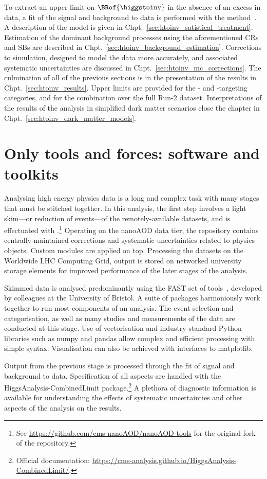 To extract an upper limit on $\BRof{\higgstoinv}$ in the absence of an excess in data, a fit of the signal and background to data is performed with the \CLs method~\cite{Read_2002}. A description of the model is given in Chpt.~\ref{sec:htoinv_satistical_treatment}. Estimation of the dominant background processes using the aforementioned \glspl{CR} and \glspl{SB} are described in Chpt.~\ref{sec:htoinv_background_estimation}. Corrections to simulation, designed to model the data more accurately, and associated systematic uncertainties are discussed in Chpt.~\ref{sec:htoinv_mc_corrections}. The culmination of all of the previous sections is in the presentation of the results in Chpt.~\ref{sec:htoinv_results}. Upper limits are provided for the \ttH- and \VH-targeting categories, and for the combination over the full Run-2 dataset. Interpretations of the results of the analysis in simplified dark matter scenarios close the chapter in Chpt.~\ref{sec:htoinv_dark_matter_models}.




\section{Only tools and forces: software and toolkits}
\label{sec:htoinv_software}

Analysing high energy physics data is a long and complex task with many stages that must be stitched together. In this analysis, the first step involves a light skim---or reduction of events---of the remotely-available datasets, and is effectuated with \nanoAODtools.\footnote{See \url{https://github.com/cms-nanoAOD/nanoAOD-tools} for the original fork of the repository.} Operating on the nanoAOD data tier, the repository contains centrally-maintained corrections and systematic uncertainties related to physics objects. Custom modules are applied on top. Processing the datasets on the Worldwide LHC Computing Grid, output is stored on networked university storage elements for improved performance of the later stages of the analysis.

Skimmed data is analysed predominantly using the FAST set of tools~\cite{fast_hep_epj}, developed by colleagues at the University of Bristol. A suite of packages harmoniously work together to run most components of an analysis. The event selection and categorisation, as well as many studies and measurements of the data are conducted at this stage. Use of vectorisation and industry-standard Python libraries such as \textsf{numpy} and \textsf{pandas} allow complex and efficient processing with simple syntax. Visualisation can also be achieved with interfaces to \textsf{matplotlib}.

Output from the previous stage is processed through the fit of signal and background to data. Specification of all aspects are handled with the \textsf{HiggsAnalysis-CombinedLimit} package.\footnote{Official documentation: \url{https://cms-analysis.github.io/HiggsAnalysis-CombinedLimit/}.} A plethora of diagnostic information is available for understanding the effects of systematic uncertainties and other aspects of the analysis on the results.
